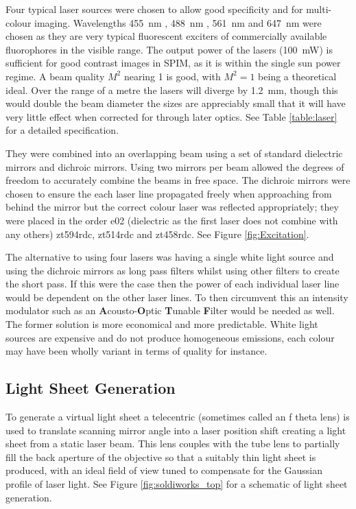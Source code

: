 Four typical laser sources were chosen to allow good specificity and for multi-colour imaging.
Wavelengths \textcolor{455nm}{\SI{455}{\nano\meter}} , \textcolor{488nm}{\SI{488}{\nano\meter}} , \textcolor{561nm}{\SI{561}{\nano\meter}} and \textcolor{647nm}{\SI{647}{\nano\meter}} were chosen as they are very typical fluorescent exciters of commercially available fluorophores in the visible range.
The output power of the lasers (\SI{100}{\milli\watt}) is sufficient for good contrast images in SPIM, as it is within the single sun power regime.
A beam quality $M^2$ nearing 1 is good, with $M^2 = 1$ being a theoretical ideal.
Over the range of a metre the lasers will diverge by \SI{1.2}{\milli\meter}, though this would double the beam diameter the sizes are appreciably small that it will have very little effect when corrected for through later optics.
See Table \ref{table:laser} for a detailed specification.

They were combined into an overlapping beam using a set of standard dielectric mirrors and dichroic mirrors.
Using two mirrors per beam allowed the degrees of freedom to accurately combine the beams in free space.
The dichroic mirrors were chosen to ensure the each laser line propagated freely when approaching from behind the mirror but the correct colour laser was reflected appropriately; they were placed in the order e02 (dielectric as the first laser does not combine with any others) zt594rdc, zt514rdc and zt458rdc.
See Figure \ref{fig:Excitation}.

The alternative to using four lasers was having a single white light source and using the dichroic mirrors as long pass filters whilst using other filters to create the short pass.
If this were the case then the power of each individual laser line would be dependent on the other laser lines.
To then circumvent this an intensity modulator such as an \textbf{A}cousto-\textbf{O}ptic \textbf{T}unable \textbf{F}ilter would be needed as well.
The former solution is more economical and more predictable.
White light sources are expensive and do not produce homogeneous emissions, each colour may have been wholly variant in terms of quality for instance.

\subsection{Light Sheet Generation}
To generate a virtual light sheet a telecentric (sometimes called an f theta lens) is used to translate scanning mirror angle into a laser position shift creating a light sheet from a static laser beam.
This lens couples with the tube lens to partially fill the back aperture of the objective so that a suitably thin light sheet is produced, with an ideal field of view tuned to compensate for the Gaussian profile of laser light.
See Figure \ref{fig:soldiworks_top} for a schematic of light sheet generation.

